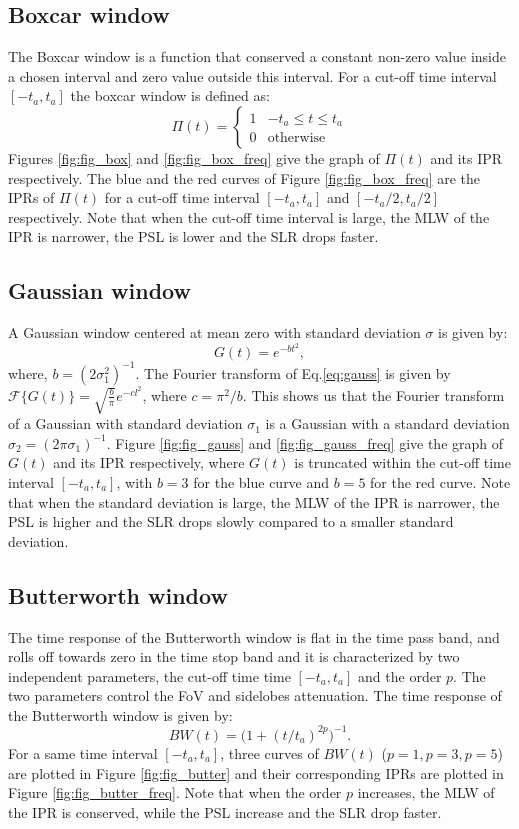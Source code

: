 \documentclass[useAMS,usenatbib]{mn2e}
\begin{document}
\subsection{Boxcar window}
The Boxcar window is a function that  conserved a constant non-zero value  inside a chosen  interval and zero value outside this interval. 
For a cut-off time interval  $[-t_a,t_a]$ the boxcar window is defined as:
\begin{equation}
\Pi(t)=\left\{
\begin{array}{rl}
1 & \mbox{$-t_a \leq t \leq t_a$} \\
0 & \mbox{otherwise}
\end{array}\right.
\end{equation}
Figures \ref{fig:fig_box} and \ref{fig:fig_box_freq} give the graph of $\Pi(t)$ and its IPR  respectively. The blue and 
the red curves of Figure \ref{fig:fig_box_freq} are the IPRs of $\Pi(t)$ for a cut-off time interval $[-t_a, t_a]$ and 
$[-t_a/2,t_a/2]$ respectively. Note that when the cut-off time interval is large, the MLW of the IPR is 
narrower, the PSL is lower and the SLR drops faster.
\subsection{Gaussian window}
A Gaussian window centered at mean zero with standard deviation $\sigma$ is given by: 
\begin{equation}
  G(t)= e^{-bt^{2}}, \label{eq:gauss}
\end{equation}
where, $b=(2\sigma_1^2)^{-1}$. The  Fourier transform of Eq.\ref{eq:gauss} is given by 
$\mathcal{F}\big\{G(t)\big\}=\sqrt{\frac{b}{\pi}}e^{-cl^2}$, where $c=\pi^2/b$.
This shows us that the Fourier transform of a Gaussian with standard deviation $\sigma_1$ is a Gaussian with a standard 
deviation $\sigma_2= (2\pi\sigma_1)^{-1}$.
Figure \ref{fig:fig_gauss} and \ref{fig:fig_gauss_freq} give the graph of $G(t)$ and its IPR respectively, where $G(t)$ 
is truncated within the cut-off time interval $[-t_a,t_a]$, with $b = 3$ for the blue curve and $b=5$ for the red curve. Note 
that when the standard deviation is large, the MLW of the IPR is narrower, the PSL is higher and the SLR drops slowly compared to a 
smaller standard deviation.
\subsection{Butterworth window}
The time response of the Butterworth window is flat  in the time pass band, and rolls off towards zero in the time stop band and it is 
characterized by two independent parameters, the cut-off time time $[-t_a,t_a]$ and the order $p$. The two parameters control the 
FoV and sidelobes  attenuation. The time response of the Butterworth window is given by:
\begin{equation}
BW(t)= \Big(1 + (t/t_a)^{2p}\Big)^{-1}.
\end{equation}
For a same time interval $[-t_a,t_a]$, three curves of $BW(t)$ ($p=1, p=3, p=5$) are plotted  in Figure \ref{fig:fig_butter} and 
their corresponding IPRs are plotted in Figure \ref{fig:fig_butter_freq}. Note that when the order $p$ increases, the MLW of the 
IPR is conserved, while the PSL increase and the SLR drop faster.
\end{document}
